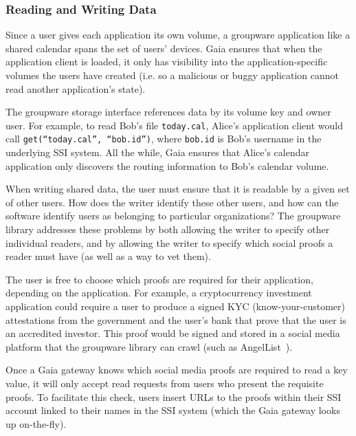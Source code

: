 \subsubsection{Reading and Writing Data}

Since a user gives each application its own volume, a groupware application like
a shared calendar spans the set of users' devices.  Gaia ensures that when the
application client is loaded, it only has visibility into the
application-specific volumes the users have created (i.e. so a malicious
or buggy application cannot read another application's state).

The groupware storage interface references data by its volume key and owner user.  For
example, to read Bob's file \texttt{today.cal}, Alice's application client would call
\texttt{get(``today.cal'', ``bob.id'')}, where \texttt{bob.id} is Bob's username
in the underlying SSI system.  All the while, Gaia
ensures that Alice's calendar application only discovers the routing information 
to Bob's calendar volume.

\hfill \break
{}
\hfill \break

When writing shared data, the user must ensure that it is readable by a given
set of other users.  How does the writer identify these other users,
and how can the software identify users as belonging to particular
organizations?  The groupware library addresses these problems by both allowing
the writer to specify other individual readers, and by allowing the writer
to specify which social proofs a reader must have (as well as a way to vet
them).  

The user is free to choose which proofs are required for their
application, depending on the application.  For example, a cryptocurrency
investment application could require a user to produce a signed KYC
(know-your-customer) attestations
from the government and the user's bank that prove that the user is an
accredited investor.  This proof would be signed and stored in a social media
platform that the groupware library can crawl (such as
AngelList~\cite{angellist}).

Once a Gaia gateway knows which social media proofs are required to read
a key value, it will only accept read requests from users who present
the requisite proofs.  To facilitate this check, users insert URLs to the
proofs within their SSI account linked to their names in the SSI system (which
the Gaia gateway looks up on-the-fly).

\hfill \break
{}
\hfill \break

